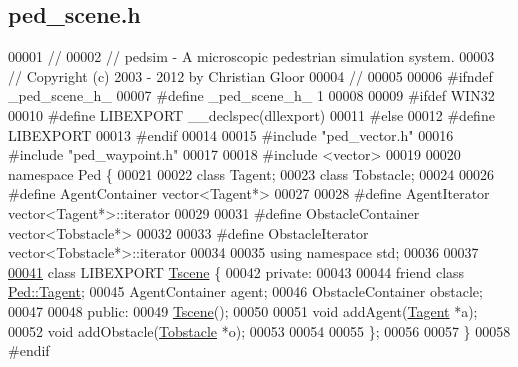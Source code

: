\hypertarget{ped__scene_8h_source}{
\subsection{ped\_\-scene.h}
}

\begin{DoxyCode}
00001 \textcolor{comment}{//}
00002 \textcolor{comment}{// pedsim - A microscopic pedestrian simulation system. }
00003 \textcolor{comment}{// Copyright (c) 2003 - 2012 by Christian Gloor}
00004 \textcolor{comment}{//                              }
00005 
00006 \textcolor{preprocessor}{#ifndef \_ped\_scene\_h\_}
00007 \textcolor{preprocessor}{}\textcolor{preprocessor}{#define \_ped\_scene\_h\_ 1}
00008 \textcolor{preprocessor}{}
00009 \textcolor{preprocessor}{#ifdef WIN32}
00010 \textcolor{preprocessor}{}\textcolor{preprocessor}{#define LIBEXPORT \_\_declspec(dllexport)}
00011 \textcolor{preprocessor}{}\textcolor{preprocessor}{#else}
00012 \textcolor{preprocessor}{}\textcolor{preprocessor}{#define LIBEXPORT}
00013 \textcolor{preprocessor}{}\textcolor{preprocessor}{#endif}
00014 \textcolor{preprocessor}{}
00015 \textcolor{preprocessor}{#include "ped\_vector.h"}
00016 \textcolor{preprocessor}{#include "ped\_waypoint.h"}
00017 
00018 \textcolor{preprocessor}{#include <vector>}
00019 
00020 \textcolor{keyword}{namespace }Ped \{
00021 
00022         \textcolor{keyword}{class }Tagent;
00023         \textcolor{keyword}{class }Tobstacle;
00024         
00026 \textcolor{preprocessor}{#define AgentContainer vector<Tagent*>}
00027 \textcolor{preprocessor}{}
00028 \textcolor{preprocessor}{#define AgentIterator vector<Tagent*>::iterator}
00029 \textcolor{preprocessor}{}        
00031 \textcolor{preprocessor}{#define ObstacleContainer vector<Tobstacle*>}
00032 \textcolor{preprocessor}{}
00033 \textcolor{preprocessor}{#define ObstacleIterator vector<Tobstacle*>::iterator}
00034 \textcolor{preprocessor}{}        
00035         \textcolor{keyword}{using namespace }std;
00036         
00037         
\hypertarget{ped__scene_8h_source_l00041}{}\hyperlink{classPed_1_1Tscene}{00041}         \textcolor{keyword}{class }LIBEXPORT \hyperlink{classPed_1_1Tscene}{Tscene} \{
00042         \textcolor{keyword}{private}:
00043 
00044                 \textcolor{keyword}{friend} \textcolor{keyword}{class }\hyperlink{classPed_1_1Tagent}{Ped::Tagent};
00045                 AgentContainer agent;                             
00046                 ObstacleContainer obstacle;
00047 
00048         \textcolor{keyword}{public}:
00049                 \hyperlink{classPed_1_1Tscene}{Tscene}();
00050                 
00051                 \textcolor{keywordtype}{void} addAgent(\hyperlink{classPed_1_1Tagent}{Tagent} *a);
00052                 \textcolor{keywordtype}{void} addObstacle(\hyperlink{classPed_1_1Tobstacle}{Tobstacle} *o);
00053 
00054                 
00055         \};
00056 
00057 \}
00058 \textcolor{preprocessor}{#endif}
\end{DoxyCode}
